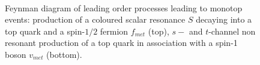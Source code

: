 \begin{figure}[!h!tpd]
\centering

\\
\caption
{
Feynman diagram of leading order processes leading to monotop events: production of
a coloured scalar resonance $S$ decaying into a top quark and a spin-$1/2$ fermion $f_{met}$ (top),
$s-$ and $t$-channel non resonant production of a top quark in association with
a spin-1 boson $v_{met}$ (bottom).
}
\label{fig:feyn_prod}
\end{figure}

